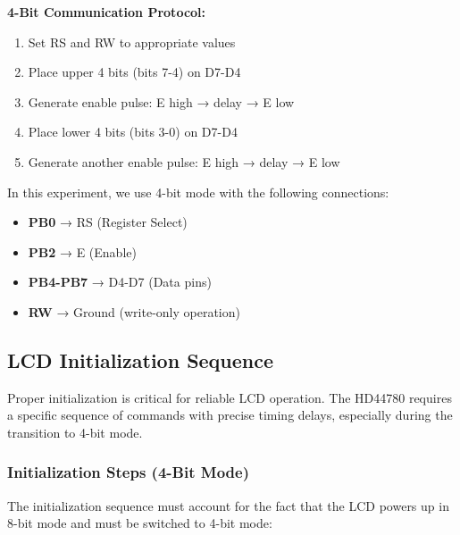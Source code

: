 \noindent
\textbf{4-Bit Communication Protocol:}
\begin{enumerate}[nosep]
  \item Set RS and RW to appropriate values
  \item Place upper 4 bits (bits 7-4) on D7-D4
  \item Generate enable pulse: E high → delay → E low
  \item Place lower 4 bits (bits 3-0) on D7-D4
  \item Generate another enable pulse: E high → delay → E low
\end{enumerate}

\noindent
In this experiment, we use 4-bit mode with the following connections:
\begin{itemize}[nosep]
  \item \textbf{PB0} → RS (Register Select)
  \item \textbf{PB2} → E (Enable)
  \item \textbf{PB4-PB7} → D4-D7 (Data pins)
  \item \textbf{RW} → Ground (write-only operation)
\end{itemize}

\subsection{LCD Initialization Sequence}

Proper initialization is critical for reliable LCD operation. The HD44780 requires a specific sequence of commands with precise timing delays, especially during the transition to 4-bit mode.

\subsubsection{Initialization Steps (4-Bit Mode)}

The initialization sequence must account for the fact that the LCD powers up in 8-bit mode and must be switched to 4-bit mode:

